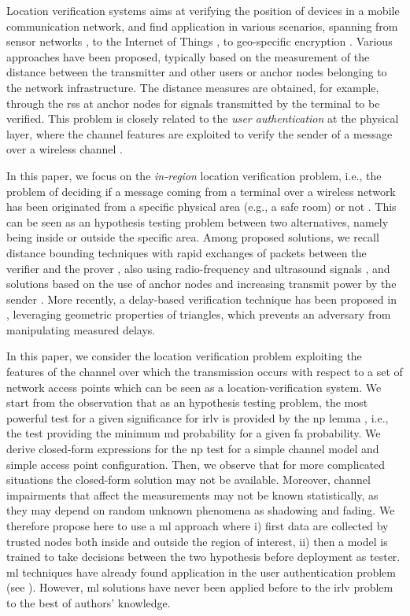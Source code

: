 \documentclass[conference]{IEEEtran}
\begin{document}
Location verification systems aims at verifying the position of devices in a mobile communication network, and find application in various scenarios, spanning from sensor networks \cite{Zeng-survey, 8376254}, to the Internet of Things \cite{7903611}, to geo-specific encryption \cite{quaglia}. Various approaches have been proposed, typically based on the measurement of the distance between the transmitter and other users  or  anchor nodes belonging to the network infrastructure. The distance measures are obtained, for example, through the \ac{rss} at anchor nodes for signals transmitted by the terminal to be verified.  This problem is closely related to the {\em user authentication} at the physical layer, where the channel features are exploited to verify the sender of a message over a wireless channel \cite{7270404}.

In this paper, we focus on the {\em in-region} location verification problem, i.e., the problem of deciding if a message coming from a terminal over a wireless network has been originated from a specific physical area (e.g., a safe room) or not \cite{quaglia}. This can be seen as an hypothesis testing problem between two alternatives, namely being inside or outside the specific area. Among proposed solutions, we recall distance bounding techniques with rapid exchanges of packets between the verifier and the prover \cite{Brands}, also using radio-frequency and ultrasound signals \cite{Sastry}, and solutions based on the use of anchor nodes and increasing transmit power by the sender \cite{Vora}. More recently, a delay-based verification technique has been proposed  in \cite{7145434}, leveraging geometric properties of triangles, which prevents an adversary from manipulating measured delays.  

In this paper, we consider the location verification problem exploiting the features of the channel over which the transmission occurs with respect to a set of network access points which can be seen as a location-verification system. We start from the observation that as an hypothesis testing problem, the most powerful test for a given significance for \ac{irlv} is provided by the \ac{np} lemma \cite{Neyman289}, i.e., the test providing the minimum \ac{md} probability for a given \ac{fa} probability. We derive closed-form expressions for the \ac{np} test for a simple channel model and simple access point configuration. Then, we observe that for more complicated situations the closed-form solution may not be available. Moreover,  channel impairments that affect the measurements may not be known statistically, as they may depend on random unknown phenomena as shadowing and fading. We therefore propose here to use a \ac{ml} approach where i) first data are collected by trusted nodes both inside and outside the region of interest, ii) then a model is trained to take decisions between the two hypothesis before deployment as tester. \ac{ml} techniques have already found application in the user authentication problem (see  \cite{pei2014channel, tian2015robust,Wang-17, xiao-2018, }). However, \ac{ml} solutions have never been applied before to the \ac{irlv} problem to the best of authors' knowledge. 
\end{document}
